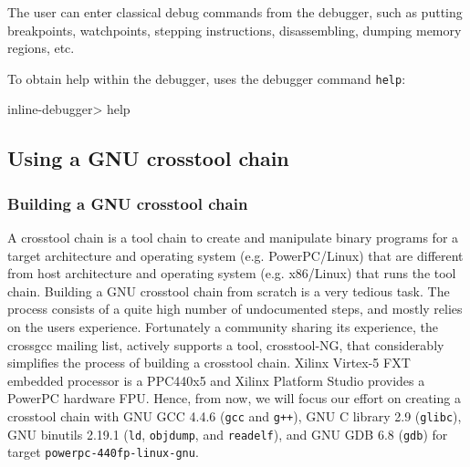 The user can enter classical debug commands from the debugger, such as putting breakpoints, watchpoints, stepping instructions, disassembling, dumping memory regions, etc.

To obtain help within the debugger, uses the debugger command \texttt{help}:
\begin{script}
   inline-debugger> help
\end{script}

\subsection{Using a GNU crosstool chain}

\subsubsection{Building a GNU crosstool chain}
\label{building_crosstool_chain}

A crosstool chain is a tool chain to create and manipulate binary programs for a target architecture and operating system (e.g. PowerPC/Linux) that are different from host architecture and operating system (e.g. x86/Linux) that runs the tool chain.
Building a GNU crosstool chain from scratch is a very tedious task.
The process consists of a quite high number of undocumented steps, and mostly relies on the users experience.
Fortunately a community sharing its experience, the crossgcc mailing list, actively supports a tool, crosstool-NG, that considerably simplifies the process of building a crosstool chain.
Xilinx Virtex-5 FXT embedded processor is a PPC440x5 and Xilinx Platform Studio provides a PowerPC hardware FPU.
Hence, from now, we will focus our effort on creating a crosstool chain with GNU GCC 4.4.6 (\texttt{gcc} and \texttt{g++}), GNU C library 2.9 (\texttt{glibc}), GNU binutils 2.19.1 (\texttt{ld}, \texttt{objdump}, and \texttt{readelf}), and GNU GDB 6.8 (\texttt{gdb}) for target \texttt{powerpc-440fp-linux-gnu}.

